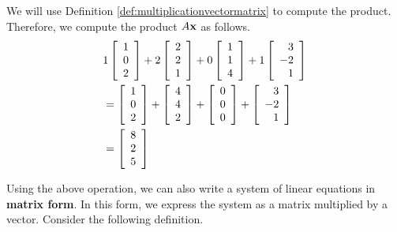 \begin{solution} We will use Definition \ref{def:multiplicationvectormatrix} to compute the product.
Therefore, we compute the product $A\mathbf{x}$ as follows. 
\begin{eqnarray*}
& 1\left[
\begin{array}{r}
1 \\
0 \\
2
\end{array}
\right] + 2\left[
\begin{array}{r}
2 \\
2 \\
1
\end{array}
\right] + 0\left[
\begin{array}{r}
1 \\
1 \\
4
\end{array}
\right] + 1 \left[
\begin{array}{r}
3 \\
-2\\
1
\end{array} 
\right] \\ 
&=
\left[
\begin{array}{r}
1 \\
0 \\
2
\end{array}
\right] + \left[
\begin{array}{r}
4 \\
4 \\
2
\end{array}
\right] + \left[
\begin{array}{r}
0 \\
0 \\
0
\end{array}
\right] +  \left[
\begin{array}{r}
3 \\
-2\\
1
\end{array} 
\right] \\
&=
\left[
\begin{array}{r}
8 \\
2 \\
5
\end{array}
\right]
\end{eqnarray*}
\end{solution}

Using the above operation, we can also write a system of linear equations in \textbf{matrix form}. In this form, 
we express the system as a matrix multiplied by a vector. Consider the following definition.

